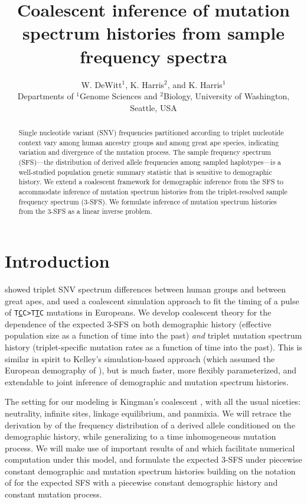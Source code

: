 \documentclass[11pt]{article}
\title{Coalescent inference of mutation spectrum histories from sample frequency spectra}
\author{
W. DeWitt$^{1}$, K. Harris$^{2}$, and K. Harris$^{1}$\\
\small{Departments of $^1$Genome Sciences and $^2$Biology, University of Washington, Seattle, USA}
}
\begin{document}
\maketitle

\begin{abstract}

Single nucleotide variant (SNV) frequencies partitioned according to triplet nucleotide context vary among human ancestry groups and among great ape species, indicating variation and divergence of the mutation process.
The sample frequency spectrum (SFS)---the distribution of derived allele frequencies among sampled haplotypes---is a well-studied population genetic summary statistic that is sensitive to demographic history.
We extend a coalescent framework for demographic inference from the SFS to accommodate inference of mutation spectrum histories from the triplet-resolved sample frequency spectrum (3-SFS).
We formulate inference of mutation spectrum histories from the 3-SFS as a linear inverse problem.

\end{abstract}


\section{Introduction}\label{sec:intro}

\cite{Harris2017-fw} showed triplet SNV spectrum differences between human groups and between great apes, and used a coalescent simulation approach to fit the timing of a pulse of \texttt{T\underline{C}C>T\underline{T}C} mutations in Europeans.
We develop coalescent theory for the dependence of the expected 3-SFS on both demographic history (effective population size as a function of time into the past) \emph{and} triplet mutation spectrum history (triplet-specific mutation rates as a function of time into the past).
This is similar in spirit to Kelley's simulation-based approach (which assumed the European demography of \cite{Tennessen2012-dq}), but is much faster, more flexibly parameterized, and extendable to joint inference of demographic and mutation spectrum histories.

The setting for our modeling is Kingman's coalescent \citep{Kingman1982-ge, Kingman1982-tf, Kingman1982-ys, Kingman2000-jr}, with all the usual niceties: neutrality, infinite sites, linkage equilibrium, and panmixia.
We will retrace the derivation by \cite{Griffiths1998-qf} of the frequency distribution of a derived allele conditioned on the demographic history, while generalizing to a time inhomogeneous mutation process.
We will make use of important results of \cite{Polanski2003-kg} and \cite{Polanski2003-ll} which facilitate numerical computation under this model, and formulate the expected 3-SFS under piecewise constant demographic and mutation spectrum histories building on the notation of \cite{Rosen2018-bb} for the expected SFS with a piecewise constant demographic history and constant mutation process.
\end{document}
